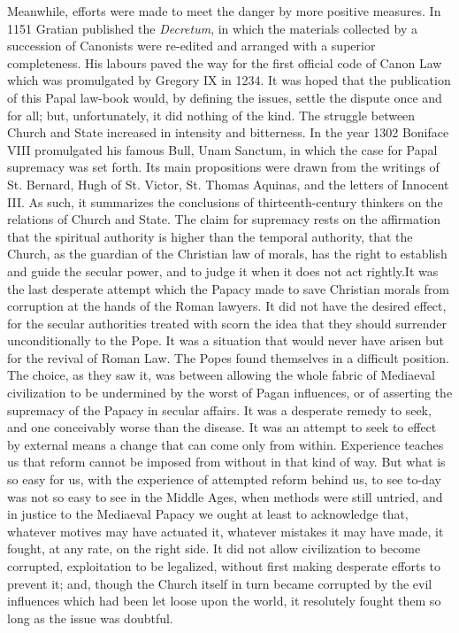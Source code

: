 \documentclass{book}
\begin{document}
Meanwhile, efforts were made to meet the danger by more positive measures. In 1151 Gratian published the \emph{Decretum}, in which the materials collected by a succession of Canonists were re-edited and arranged with a superior completeness. His labours paved the way for the first official code of Canon Law which was promulgated by Gregory IX in 1234. It was hoped that the publication of this Papal law-book would, by defining the issues, settle the dispute once and for all; but, unfortunately, it did nothing of the kind. The struggle between Church and State increased in intensity and bitterness. In the year 1302 Boniface VIII promulgated his famous Bull, Unam Sanctum, in which the case for Papal supremacy was set forth. Its main propositions were drawn from the writings of St. Bernard, Hugh of St. Victor, St. Thomas Aquinas, and the letters of Innocent III. As such, it summarizes the conclusions of thirteenth-century thinkers on the relations of Church and State. The claim for supremacy rests on the affirmation that the spiritual authority is higher than the temporal authority, that the Church, as the guardian of the Christian law of morals, has the right to establish and guide the secular power, and to judge it when it does not act rightly.\footnotemark[4] It was the last desperate attempt which the Papacy made to save Christian morals from corruption at the hands of the Roman lawyers. It did not have the desired effect, for the secular authorities treated with scorn the idea that they should surrender unconditionally to the Pope. It was a situation that would never have arisen but for the revival of Roman Law. The Popes found themselves in a difficult position. The choice, as they saw it, was between allowing the whole fabric of Mediaeval civilization to be undermined by the worst of Pagan influences, or of asserting the supremacy of the Papacy in secular affairs. It was a desperate remedy to seek, and one conceivably worse than the disease. It was an attempt to seek to effect by external means a change that can come only from within. Experience teaches us that reform cannot be imposed from without in that kind of way. But what is so easy for us, with the experience of attempted reform behind us, to see to-day was not so easy to see in the Middle Ages, when methods were still untried, and in justice to the Mediaeval Papacy we ought at least to acknowledge that, whatever motives may have actuated it, whatever mistakes it may have made, it fought, at any rate, on the right side. It did not allow civilization to become corrupted, exploitation to be legalized, without first making desperate efforts to prevent it; and, though the Church itself in turn became corrupted by the evil influences which had been let loose upon the world, it resolutely fought them so long as the issue was doubtful.
\end{document}
